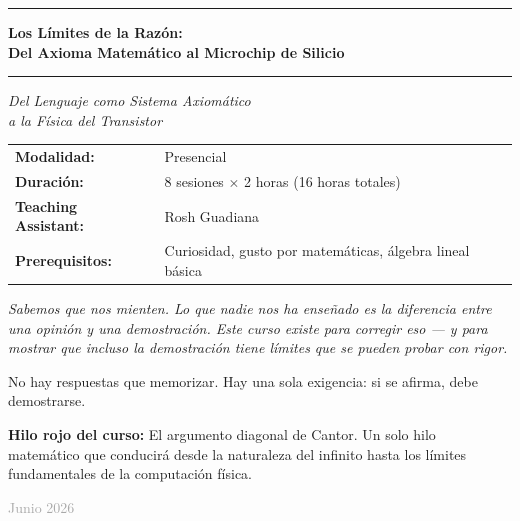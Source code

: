 \documentclass[11pt, letterpaper]{article}
\begin{document}
\begin{titlepage}
\begin{center}

\textcolor{mitred}{\rule{\linewidth}{1.2pt}}
\vspace{0.4cm}

{\LARGE\bfseries Los Límites de la Razón:\\ [0.3em] Del Axioma Matemático al Microchip de Silicio}

\vspace{0.3cm}
\textcolor{mitred}{\rule{\linewidth}{1.2pt}}
\vspace{0.6cm}

{\large\itshape Del Lenguaje como Sistema Axiom\'atico\\
a la F\'isica del Transistor}

\vspace{1.4cm}

\begin{tabular}{ll}
\textbf{Modalidad:}           & Presencial \\[3pt]
\textbf{Duraci\'on:}          & 8 sesiones $\times$ 2 horas (16 horas totales) \\[3pt]
\textbf{Teaching Assistant:}  & Rosh Guadiana \\[3pt]
\textbf{Prerequisitos:}       & Curiosidad, gusto por matem\'aticas, \'algebra lineal b\'asica \\[3pt]
\end{tabular}

\vspace{1.6cm}

\begin{tcolorbox}[
  colback=mitred!4, colframe=mitred,
  boxrule=0.8pt, left=10pt, right=10pt, top=8pt, bottom=8pt]
{\small\itshape
Sabemos que nos mienten. Lo que nadie nos ha ense\~nado es la diferencia entre
una opini\'on y una demostraci\'on. Este curso existe para corregir eso
--- y para mostrar que incluso la demostraci\'on tiene l\'imites
que se pueden probar con rigor.

\medskip
No hay respuestas que memorizar. Hay una sola exigencia:
si se afirma, debe demostrarse.}
\end{tcolorbox}

\vspace{1.2cm}

\begin{tcolorbox}[
  colback=white, colframe=diagonalred,
  boxrule=0.6pt, left=8pt, right=8pt, top=6pt, bottom=6pt]
{\footnotesize\textbf{Hilo rojo del curso:} El argumento diagonal de Cantor. Un solo hilo matem\'atico que conducir\'a desde la naturaleza del infinito hasta los l\'imites fundamentales de la computaci\'on f\'isica.}
\end{tcolorbox}

\vfill
{\small\textcolor{darkgray}{Junio 2026}}
\end{center}
\end{titlepage}
\end{document}
